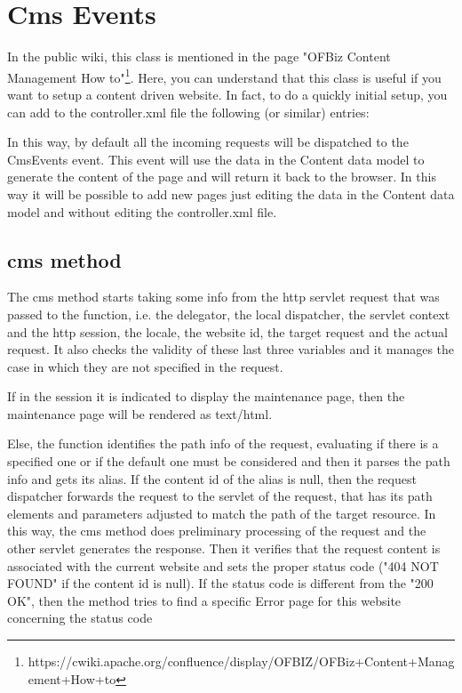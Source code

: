 \section{Cms Events}

In the public wiki, this class is mentioned in the page "OFBiz Content Management How to"\footnote{https://cwiki.apache.org/confluence/display/OFBIZ/OFBiz+Content+Management+How+to}. Here, you can understand that this class is useful if you want to setup a content driven website. In fact, to do a quickly initial setup, you can add to the controller.xml file the following (or similar) entries:

    
    
In this way, by default all the incoming requests will be dispatched to the CmsEvents event.
This event will use the data in the Content data model to generate the content of the page and will return it back to the browser.
In this way it will be possible to add new pages just editing the data in the Content data model and without editing the controller.xml file.


\subsection{cms method}

The cms method starts taking some info from the http servlet request that was passed to the function, i.e. the delegator, the local dispatcher, the servlet context and the http session, the locale, the website id, the target request and the actual request. It also checks the validity of these last three variables and it manages the case in which they are not specified in the request.

If in the session it is indicated to display the maintenance page, then the maintenance page will be rendered as text/html.

Else, the function identifies the path info of the request, evaluating if there is a specified one or if the default one must be considered and then it parses the path info and gets its alias.
If the content id of the alias is null, then the request dispatcher forwards the request to the servlet of the request, that has its path elements and parameters adjusted to match the path of the target resource. In this way, the cms method does preliminary processing of the request and the other servlet generates the response. 
Then it verifies that the request content is associated with the current website and sets the proper status code ("404 NOT FOUND" if the content id is null). If the status code is different from the "200 OK", then the method tries to find a specific Error page for this website concerning the status code
